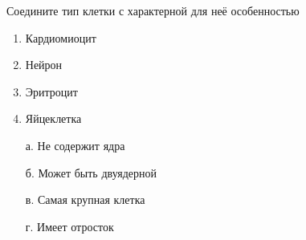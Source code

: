
Соедините
тип клетки с характерной для неё особенностью

\begin{multicols}{2}
    {
        \begin{enumerate}
            \item Кардиомиоцит
            \item Нейрон
            \item Эритроцит
            \item Яйцеклетка
        \end{enumerate}
    }
    {
        \begin{enumerate}
            \item[а.] Не содержит ядра
            \item[б.] Может быть двуядерной
            \item[в.] Самая крупная клетка
            \item[г.] Имеет отросток
        \end{enumerate}
    }
\end{multicols}

